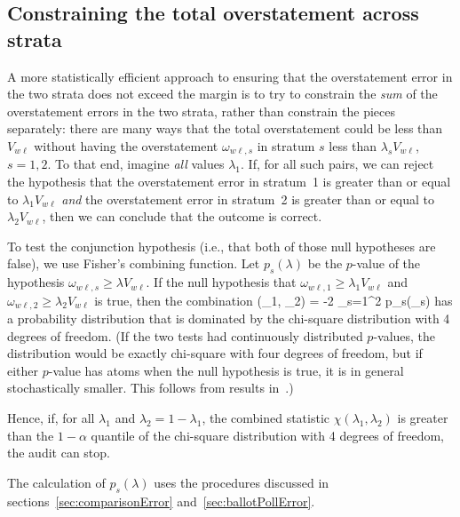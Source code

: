 \subsection{Constraining the total overstatement across strata}
A more statistically efficient approach to ensuring that the overstatement error in the 
two strata does not
exceed the margin is to try to constrain the \emph{sum} of the overstatement errors in the two
strata, rather than constrain the pieces separately:
there are many ways that the total overstatement could be less than $V_{w\ell}$ without
having the overstatement $\omega_{w\ell,s}$
in stratum $s$ less than $\lambda_s V_{w\ell}$, $s = 1, 2$.
To that end, imagine \emph{all} values $\lambda_1$.
If, for all such pairs, we can reject the hypothesis that the 
overstatement error in stratum~1 is greater than or equal to $\lambda_1 V_{w\ell}$ \emph{and} 
the overstatement error in stratum~2 is greater than or equal to $\lambda_2 V_{w\ell}$, then
we can conclude that the outcome is correct.

To test the conjunction hypothesis (i.e., that both of those null hypotheses are false), we use 
Fisher's combining function.
Let $p_s(\lambda)$ be the $p$-value of the hypothesis $\omega_{w\ell,s} \ge \lambda V_{w\ell}$.
If the null hypothesis that $\omega_{w\ell,1} \ge \lambda_1 V_{w\ell}$ and 
$\omega_{w\ell,2} \ge \lambda_2 V_{w\ell}$ is true, then the combination
\beq
   \chi(\lambda_1, \lambda_2) = -2 \sum_{s=1}^2 \ln p_s(\lambda_s)
\eeq
has a probability distribution that is dominated by the chi-square distribution with 4 degrees
of freedom.
(If the two tests had continuously distributed $p$-values, the distribution would be exactly
chi-square with four degrees of freedom, but if either $p$-value has atoms when
the null hypothesis is true, it is in general stochastically smaller.
This follows from results in~\citep{???}.)

Hence, if, for all $\lambda_1$ and $\lambda_2 = 1- \lambda_1$,
the combined statistic $\chi(\lambda_1, \lambda_2)$ is greater than the 
$1-\alpha$ quantile of the chi-square
distribution with 4 degrees of freedom, the audit can stop.

The calculation of $p_s(\lambda)$ 
uses the procedures discussed in 
sections~\ref{sec:comparisonError} and~\ref{sec:ballotPollError}.